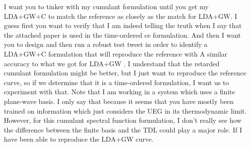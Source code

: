 I want you to tinker with my cumulant formulation until you get my LDA+GW+C to match the reference as closely as the match for LDA+GW. I guess first you want to verify that I am indeed telling the truth when I say that the attached paper is used in the time-ordered ce formulation. And then I want you to design and then run a robust test tweet in order to identify a LDA+GW+C formulation that will reproduce the reference with A similar accuracy to what we got for LDA+GW . I understand that the retarded cumulant formulation might be better, but I just want to reproduce the reference curve, so if we determine that it is a time-ordered formulation, I want us to experiment with that. Note that I am working in a system which uses a finite plane-wave basis. I only say that because it seems that you have mostly been trained on information which just considers the UEG in its thermodynamic limit. However, for this cumulant spectral function formulation, I don't really see how the difference between the finite basis and the TDL could play a major role. If I have been able to reproduce the LDA+GW curve.

